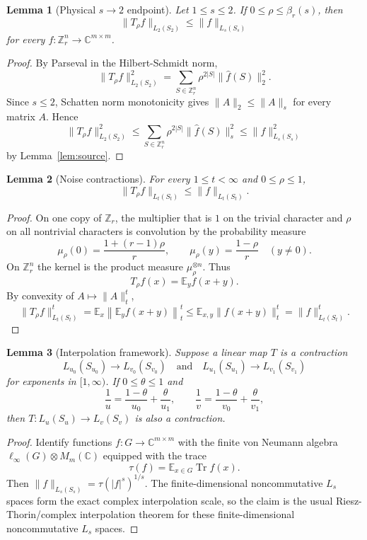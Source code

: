 \documentclass[11pt]{article}
\newtheorem{lemma}{Lemma}
\newcommand{\C}{\mathbb C}
\newcommand{\Z}{\mathbb Z}
\newcommand{\E}{\mathbb E}
\newcommand{\Tr}{\operatorname{Tr}}
\begin{document}
\begin{lemma}[Physical $s\to2$ endpoint]
\label{lem:s-to-two}
Let $1\leq s\leq2$. If $0\leq\rho\leq\beta_r(s)$, then
\[
  \|T_\rho f\|_{L_2(S_2)}\leq \|f\|_{L_s(S_s)}
\]
for every $f:\Z_r^n\to\C^{m\times m}$.
\end{lemma}

\begin{proof}
By Parseval in the Hilbert-Schmidt norm,
\[
  \|T_\rho f\|_{L_2(S_2)}^2
  =
  \sum_{S\in\Z_r^n}\rho^{2|S|}\|\widehat f(S)\|_2^2 .
\]
Since $s\leq2$, Schatten norm monotonicity gives
$\|A\|_2\leq\|A\|_s$ for every matrix $A$. Hence
\[
  \|T_\rho f\|_{L_2(S_2)}^2
  \leq
  \sum_{S\in\Z_r^n}\rho^{2|S|}\|\widehat f(S)\|_s^2
  \leq
  \|f\|_{L_s(S_s)}^2
\]
by Lemma~\ref{lem:source}.
\end{proof}

\begin{lemma}[Noise contractions]
\label{lem:contraction}
For every $1\leq t<\infty$ and $0\leq\rho\leq1$,
\[
  \|T_\rho f\|_{L_t(S_t)}\leq\|f\|_{L_t(S_t)} .
\]
\end{lemma}

\begin{proof}
On one copy of $\Z_r$, the multiplier that is $1$ on the trivial character
and $\rho$ on all nontrivial characters is convolution by the probability
measure
\[
  \mu_\rho(0)=\frac{1+(r-1)\rho}{r},\qquad
  \mu_\rho(y)=\frac{1-\rho}{r}\quad(y\neq0).
\]
On $\Z_r^n$ the kernel is the product measure $\mu_\rho^{\otimes n}$. Thus
\[
  T_\rho f(x)=\E_y f(x+y).
\]
By convexity of $A\mapsto\|A\|_t^t$,
\[
  \|T_\rho f\|_{L_t(S_t)}^t
  =
  \E_x\left\|\E_y f(x+y)\right\|_t^t
  \leq
  \E_{x,y}\|f(x+y)\|_t^t
  =
  \|f\|_{L_t(S_t)}^t .
\]
\end{proof}

\begin{lemma}[Interpolation framework]
\label{lem:interp}
Suppose a linear map $T$ is a contraction
\[
  L_{u_0}(S_{u_0})\to L_{v_0}(S_{v_0})
  \quad\text{and}\quad
  L_{u_1}(S_{u_1})\to L_{v_1}(S_{v_1})
\]
for exponents in $[1,\infty)$. If $0\leq\theta\leq1$ and
\[
  \frac1u=\frac{1-\theta}{u_0}+\frac{\theta}{u_1},
  \qquad
  \frac1v=\frac{1-\theta}{v_0}+\frac{\theta}{v_1},
\]
then $T:L_u(S_u)\to L_v(S_v)$ is also a contraction.
\end{lemma}

\begin{proof}
Identify functions $f:G\to\C^{m\times m}$ with the finite von Neumann algebra
$\ell_\infty(G)\otimes M_m(\C)$ equipped with the trace
\[
  \tau(f)=\E_{x\in G}\Tr f(x).
\]
Then $\|f\|_{L_s(S_s)}=\tau(|f|^s)^{1/s}$. The finite-dimensional
noncommutative $L_s$ spaces form the exact complex interpolation scale, so the
claim is the usual Riesz-Thorin/complex interpolation theorem for these
finite-dimensional noncommutative $L_s$ spaces.
\end{proof}
\end{document}
